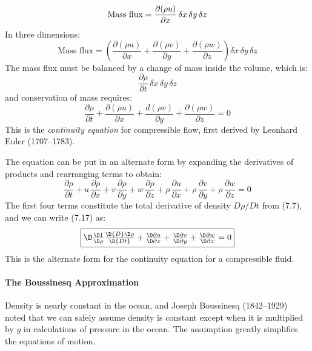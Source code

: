 \begin{equation}
\text{Mass flux} =
\frac{\partial{(\rho{u})}}{\partial{x}}\,\delta{x}\,\delta{y}\,\delta{z} \notag
\end{equation}
In three dimensions:
\begin{displaymath}
\mbox{Mass flux} = \left(\frac{\partial{(\rho{u})}}{\partial{x}} +
\frac{\partial{(\rho{v})}}{\partial{y}} +
\frac{\partial{(\rho{w})}}{\partial{z}}\right)\delta{x}\,\delta{y}\,\delta{z}
\end{displaymath}
The mass flux must be balanced by a change of mass inside the volume,
which is:
\begin{displaymath}
\frac{\partial\rho}{\partial{t}}\,\delta{x}\,\delta{y}\,\delta{z}
\end{displaymath}
and conservation of mass requires:
\begin{equation}
\frac{\partial\rho}{\partial{t}} + \frac{\partial{(\rho{u})}}{\partial{x}} + \frac{d(\rho{v})}{\partial{y}} + \frac{\partial{(\rho{w})}}{\partial{z}} = 0
\end{equation}
This is the \textit{continuity equation} for compressible flow, first derived by Leonhard
Euler (1707--1783).

The equation can be put in an alternate form by expanding the
derivatives of products and rearranging terms to obtain:
\begin{displaymath}
\frac{\partial{\rho}}{\partial{t}} + u\,\frac{\partial{\rho}}{\partial{x}} + v\,\frac{\partial{\rho}}{\partial{y}} + w\,\frac{\partial{\rho}}{\partial{z}} +
\rho\,\frac{\partial{u}}{\partial{x}} + \rho\,\frac{\partial{v}}{\partial{y}} + \rho\,\frac{\partial{w}}{\partial{z}} = 0
\end{displaymath}
The first four terms constitute the total derivative of density
$D\rho/Dt$ from (7.7), and we can write (7.17) as:
\begin{equation}
\fbox{$\D
\frac{\D1}{\D\rho}\frac{\D{D}\D\rho}{\D{Dt}} + \frac{\D\partial{u}}{\D\partial{x}} + \frac{\D\partial{v}}{\D\partial{y}} + \frac{\D\partial{w}}{\D\partial{z}} =
0
$}\end{equation}
This is the alternate form for the continuity equation for a
compressible fluid.

\paragraph{The Boussinesq Approximation}
Density is nearly constant in the
ocean, and Joseph Boussinesq (1842--1929) noted that we can safely
assume density is constant except when it is multiplied by $g$ in
calculations of pressure in the ocean. The assumption greatly
simplifies the equations of motion.

